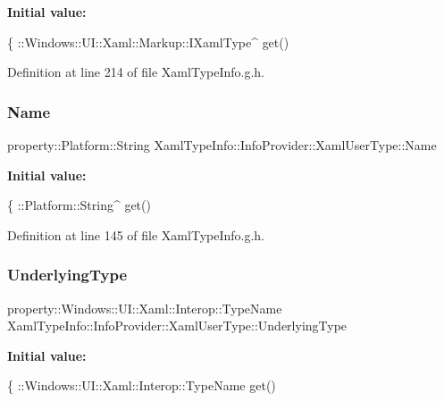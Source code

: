 {\bfseries Initial value\+:}
\begin{DoxyCode}
\{ 
                ::Windows::UI::Xaml::Markup::IXamlType^ \textcolor{keyword}{get}()
\end{DoxyCode}


Definition at line 214 of file Xaml\+Type\+Info.\+g.\+h.

\mbox{\label{class_xaml_type_info_1_1_info_provider_1_1_xaml_user_type_ae4f73351219be7832cb30b118ed7f257}} 
\subsubsection{\texorpdfstring{Name}{Name}}
{\footnotesize\ttfamily property\+::\+Platform\+::\+String Xaml\+Type\+Info\+::\+Info\+Provider\+::\+Xaml\+User\+Type\+::\+Name}

{\bfseries Initial value\+:}
\begin{DoxyCode}
\{
                ::Platform::String^ \textcolor{keyword}{get}()
\end{DoxyCode}


Definition at line 145 of file Xaml\+Type\+Info.\+g.\+h.

\mbox{\label{class_xaml_type_info_1_1_info_provider_1_1_xaml_user_type_aa5bdf0da240db6feabb8ae26953c57cd}} 
\subsubsection{\texorpdfstring{Underlying\+Type}{UnderlyingType}}
{\footnotesize\ttfamily property\+::\+Windows\+::\+U\+I\+::\+Xaml\+::\+Interop\+::\+Type\+Name Xaml\+Type\+Info\+::\+Info\+Provider\+::\+Xaml\+User\+Type\+::\+Underlying\+Type}

{\bfseries Initial value\+:}
\begin{DoxyCode}
\{
                ::Windows::UI::Xaml::Interop::TypeName \textcolor{keyword}{get}()
\end{DoxyCode}


